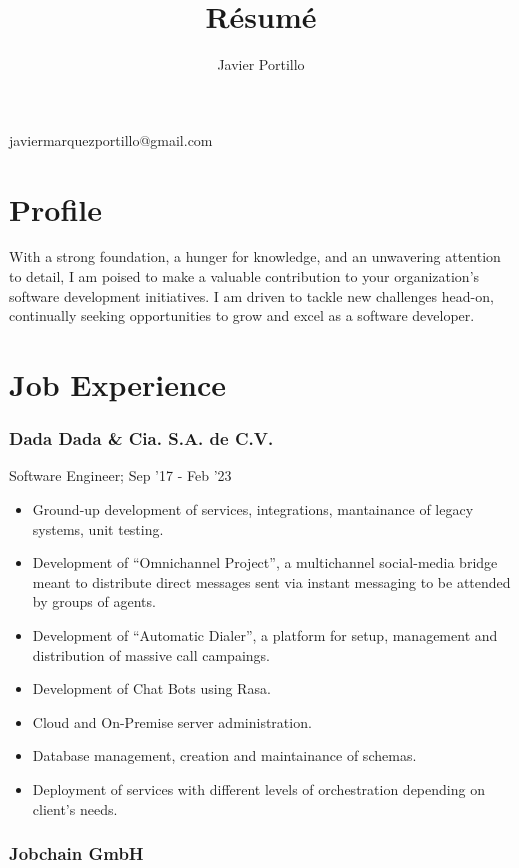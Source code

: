 \documentclass[letterpaper]{article}
\makeatletter
\renewcommand{\maketitle}{
	\begin{center}
		{\huge\bfseries\theauthor}

		\vspace{.5em}

		javiermarquezportillo@gmail.com
	\end{center}
}
\makeatother
\begin{document}
\title{R\'esum\'e}
\author{Javier Portillo}

\maketitle

\section{Profile}

With a strong foundation, a hunger for knowledge, and an unwavering attention to detail, I am poised to make a valuable contribution to your organization's software development initiatives. I am driven to tackle new challenges head-on, continually seeking opportunities to grow and excel as a software developer.

\section{Job Experience}

\subsubsection{Dada Dada \& Cia. S.A. de C.V.}

Software Engineer; Sep '17 - Feb '23

\begin{itemize}
  \item Ground-up development of services, integrations, mantainance of legacy systems, unit testing.
  \item Development of ``Omnichannel Project'', a multichannel social-media bridge meant to distribute direct messages sent via instant messaging to be attended by groups of agents.
  \item Development of ``Automatic Dialer'', a platform for setup, management and distribution of massive call campaings.
  \item Development of Chat Bots using Rasa.
  \item Cloud and On-Premise server administration.
  \item Database management, creation and maintainance of schemas.
  \item Deployment of services with different levels of orchestration depending on client's needs.
\end{itemize}

\subsubsection{Jobchain GmbH}
\end{document}
